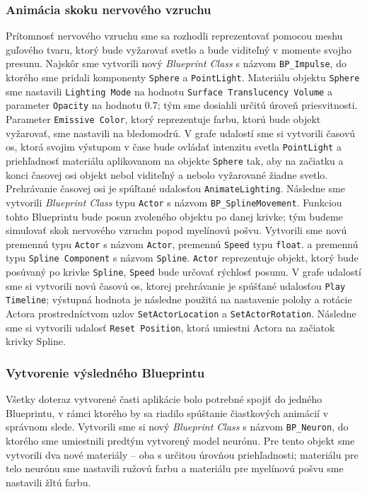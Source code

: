 \subsubsection{Animácia skoku nervového vzruchu}
Prítomnosť nervového vzruchu sme sa rozhodli reprezentovať pomocou meshu guľového tvaru, ktorý bude vyžarovať svetlo a bude viditeľný v momente svojho presunu. Najskôr sme vytvorili nový \emph{Blueprint Class} s názvom
\texttt{BP\_Impulse}, do ktorého sme pridali komponenty \texttt{Sphere} a \texttt{PointLight}. Materiálu objektu \texttt{Sphere} sme nastavili \texttt{Lighting Mode} na hodnotu \texttt{Surface Translucency Volume} a 
parameter \texttt{Opacity} na hodnotu 0.7; tým sme dosiahli určitú úroveň priesvitnosti. Parameter \texttt{Emissive Color}, ktorý reprezentuje farbu, ktorú bude objekt vyžarovať, sme nastavili na bledomodrú.
V grafe udalostí sme si vytvorili časovú os, ktorá svojim výstupom v čase bude ovládať intenzitu svetla \texttt{PointLight} a priehľadnosť materiálu aplikovanom na objekte \texttt{Sphere} tak, aby na začiatku a konci časovej 
osi objekt nebol viditeľný a nebolo vyžarované žiadne svetlo. Prehrávanie časovej osi je spúľtané udalosťou \texttt{AnimateLighting}.
\newpage
Následne sme vytvorili \emph{Blueprint Class} typu \texttt{Actor} s názvom \texttt{BP\_SplineMovement}. Funkciou tohto Blueprintu bude posun zvoleného objektu po danej krivke; tým budeme simulovať skok nervového vzruchu
popod myelínovú pošvu. Vytvorili sme novú premennú typu \texttt{Actor} s názvom \texttt{Actor}, premennú \texttt{Speed} typu \texttt{float}. a premennú typu \texttt{Spline Component} s názvom \texttt{Spline}. 
\texttt{Actor} reprezentuje objekt, ktorý bude posúvaný po krivke \texttt{Spline}, \texttt{Speed} bude určovať rýchlosť posunu. V grafe udalostí sme si vytvorili novú časovú os, ktorej prehrávanie je spúšťané udalosťou
\texttt{Play Timeline}; výstupná hodnota je následne použitá na nastavenie polohy a rotácie Actora prostredníctvom uzlov \texttt{SetActorLocation} a \texttt{SetActorRotation}. Následne sme si vytvorili udalosť \texttt{Reset Position},
ktorá umiestni Actora na začiatok krivky Spline.

\subsubsection{Vytvorenie výsledného Blueprintu}
Všetky doteraz vytvorené časti aplikácie bolo potrebné spojiť do jedného Blueprintu, v rámci ktorého by sa riadilo spúštanie čiastkových animácií v správnom slede. Vytvorili sme si nový \emph{Blueprint Class} s názvom
\texttt{BP\_Neuron}, do ktorého sme umiestnili predtým vytvorený model neurónu. Pre tento objekt sme vytvorili dva nové materiály {--} oba s určitou úrovňou priehľadnosti; materiálu pre telo neurónu sme nastavili ružovú farbu a 
materiálu pre myelínovú pošvu sme nastavili žltú farbu.

